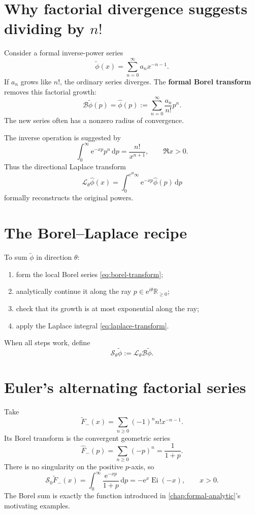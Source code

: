 \documentclass[11pt,openany]{book}
\theoremstyle{plain}
\theoremstyle{definition}
\theoremstyle{remark}
\newcommand{\R}{\mathbb{R}}
\newcommand{\Ei}{\operatorname{Ei}}
\newcommand{\Borel}{\mathcal{B}}
\newcommand{\Laplace}{\mathcal{L}}
\newcommand{\dd}{\,\mathrm{d}}
\newcommand{\e}{\mathrm{e}}
\newcommand{\defterm}[1]{\textbf{#1}}
\begin{document}
\section{\texorpdfstring{Why factorial divergence suggests dividing by $n!$}{Why factorial divergence suggests dividing by n factorial}}
Consider a formal inverse-power series
\[
  \widetilde\phi(x)=\sum_{n=0}^{\infty}a_nx^{-n-1}.
\]
If $a_n$ grows like $n!$, the ordinary series diverges. The \defterm{formal Borel transform} removes this factorial growth:
\[
  \Borel\widetilde\phi(p)
  =\widehat\phi(p)
  :=\sum_{n=0}^{\infty}\frac{a_n}{n!}p^n.
  \label{eq:borel-transform}
\]
The new series often has a nonzero radius of convergence.

The inverse operation is suggested by
\[
  \int_0^\infty\e^{-xp}p^n\dd p
  =\frac{n!}{x^{n+1}},
  \qquad \Re x>0.
\]
Thus the directional Laplace transform
\[
  \Laplace_\theta\widehat\phi(x)
  =\int_0^{\e^{i\theta}\infty}
    \e^{-xp}\widehat\phi(p)\dd p
  \label{eq:laplace-transform}
\]
formally reconstructs the original powers.

\section{The Borel--Laplace recipe}
To sum $\widetilde\phi$ in direction $\theta$:
\begin{enumerate}
\item form the local Borel series \cref{eq:borel-transform};
\item analytically continue it along the ray $p\in\e^{i\theta}\R_{\ge0}$;
\item check that its growth is at most exponential along the ray;
\item apply the Laplace integral \cref{eq:laplace-transform}.
\end{enumerate}
When all steps work, define
\[
  \mathscr S_\theta\widetilde\phi
  :=\Laplace_\theta\Borel\widetilde\phi.
\]

\section{Euler's alternating factorial series}
Take
\[
  \widetilde F_-(x)=
  \sum_{n\ge0}(-1)^n n!x^{-n-1}.
\]
Its Borel transform is the convergent geometric series
\[
  \widehat F_-(p)=\sum_{n\ge0}(-p)^n=\frac1{1+p}.
\]
There is no singularity on the positive $p$-axis, so
\[
  \mathscr S_0\widetilde F_-(x)
  =\int_0^\infty\frac{\e^{-xp}}{1+p}\dd p
  =-\e^x\Ei(-x),
  \qquad x>0.
\]
The Borel sum is exactly the function introduced in \cref{chap:formal-analytic}'s motivating examples.
\end{document}
